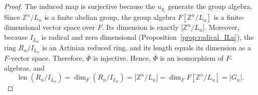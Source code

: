 \documentclass[11pt]{amsart}
\theoremstyle{plain}
\theoremstyle{definition}
\theoremstyle{remark}
\begin{document}
\begin{proof}
	The induced map is surjective because the \( u_{g_i} \) generate the group algebra. Since \(\mathbb{Z}^n / L_n\) is a finite abelian group, the group algebra \(F[\mathbb{Z}^n / L_n]\) is a finite-dimensional vector space over \(F\). Its dimension is exactly \(|\mathbb{Z}^n / L_n|\). Moreover, because \(I_{L_n}\) is radical and zero dimensional (Proposition~\ref{prop:radical_ILn}), the ring \(R_n/I_{L_n}\) is an Artinian reduced ring, and its length equals its dimension as a \(F\)-vector space. Therefore, \( \overline{\Phi }\) is injective. Hence, \( \overline{\Phi} \) is an isomorphism of \( F \)-algebras, and \[
	\operatorname{len}(R_n / I_{L_n}) = \dim_F (R_n/I_{L_n}) = | \mathbb{Z}^n / L_n | = \dim_F F[\mathbb{Z}^n / L_n] = |G_n|.
	\]
    
\end{proof}
\end{document}
